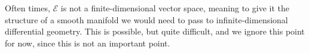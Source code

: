 Often times, $\mathcal{E} $ is not a finite-dimensional vector space, meaning to give it the structure of a smooth manifold we would need to pass to infinite-dimensional differential geometry. This is possible, but quite difficult, and we ignore this point for now, since this is not an important point.
